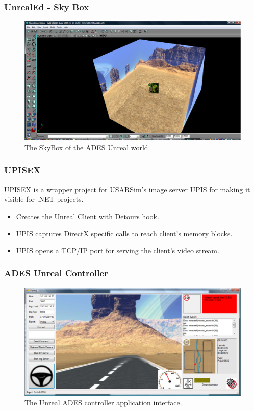 \documentclass{beamer}
\begin{document}
\begin{frame}
	\frametitle{UnrealEd - Sky Box}
	\begin{figure}[ht]
	\begin{center}
	\includegraphics[width=.6\paperwidth]{../img/SkyBox.eps}
	\caption{The SkyBox of the ADES Unreal world.}
	\label{fig:SkyBox}
	\end{center}
	\end{figure}
\end{frame}

\begin{frame}
	\frametitle{UPISEX}
	\begin{block}{}
		UPISEX is a wrapper project for USARSim's image server UPIS for making it visible for .NET projects.
	\end{block}
	\begin{itemize}
	    \item Creates the Unreal Client with Detours hook.
	    \item UPIS captures DirectX specific calls to reach client's memory blocks.
	    \item UPIS opens a TCP/IP port for serving the client's video stream.
	\end{itemize}
\end{frame}

\begin{frame}
	\frametitle{ADES Unreal Controller} 
	\begin{figure}[ht]
	\begin{center}
	\includegraphics[width=.7\paperwidth]{../img/ADESController.eps}
	\caption{The Unreal ADES controller application interface.}
	\label{fig:ADESController}
	\end{center}
	\end{figure}
\end{frame}
\end{document}
